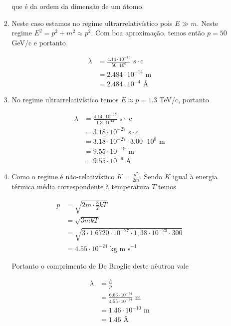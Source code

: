 \documentclass[a4paper, 12pt, notitlepage]{article}
\begin{document}
\begin{enumerate}
\begin{enumerate}
\begin{enumerate}
      \noindent que é da ordem da dimensão de um átomo.

    \item Neste caso estamos no regime ultrarrelativístico pois $E \gg m$. Neste regime $E^2 = p^2 + m^2 \approx p^2$. Com boa aproximação, temos então $p = 50$ GeV/c e portanto

      \begin{align*}
\lambda &= \frac{4.14 \cdot 10^{-15}}{50 \cdot 10^6} \text{ s}\cdot\text{c} \\
&= 2.484 \cdot 10^{-14} \text{ m} \\
&= 2.484 \cdot 10^{-4} \text{ \AA}
      \end{align*}

    \item No regime ultrarrelativístico temos $E \approx p = 1.3$ TeV/c, portanto

      \begin{align*}
\lambda &= \frac{4.14 \cdot 10^{-15}}{1.3 \cdot 10^{12}}\text{ s}\cdot \text{ c} \\
&= 3.18 \cdot 10^{-27} \text{ s}\cdot{ c} \\
&= 3.18 \cdot 10^{-27} \cdot 3.00 \cdot 10^8 \text{ m} \\
&= 9.55 \cdot 10^{-19} \text{ m} \\
&= 9.55 \cdot 10^{-9} \text{ \AA}
      \end{align*}

    \item Como o regime é não-relativístico $K = \frac{p^2}{2m}$. Sendo $K$ igual à energia térmica média correspondente à temperatura $T$ temos

      \begin{align*} 
p &= \sqrt{2m \cdot \frac{3}{2} kT}\\
&= \sqrt{3mkT}\\
&= \sqrt{3\cdot 1.6720 \cdot 10^{-27}\cdot 1,38 \cdot 10^{-23}\cdot 300}  \\
&= 4.55 \cdot 10^{-24} \text{ kg m s}^{-1}
      \end{align*}

      Portanto o comprimento de De Broglie deste nêutron vale

      \begin{align*}
\lambda &= \frac{h}{p} \\
&= \frac{6.63 \cdot 10^{-34}}{4.55 \cdot 10^{-24}}\text{ m} \\
&= 1.46 \cdot 10^{-10}\text{ m} \\
&= 1.46 \text{ \AA}
      \end{align*}
      

\end{enumerate}
\end{enumerate}
\end{enumerate}
\end{document}
